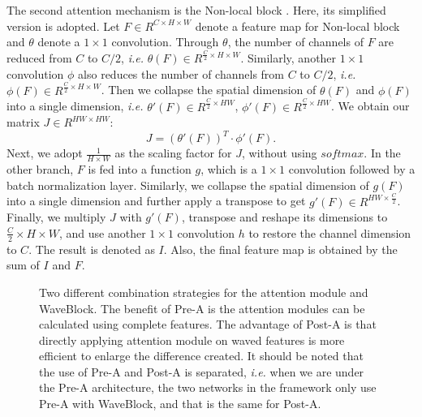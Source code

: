 \documentclass[journal]{IEEEtran}
\begin{document}
The second attention mechanism is the Non-local block \cite{wang2018non}. Here, its simplified version is adopted. Let $F \in {R^{ C \times H \times W}}$ denote a feature map for Non-local block and $\theta$ denote a $1 \times 1$ convolution. Through $\theta$, the number of channels of $F$ are reduced from $C$ to $C/2$, \textit{i.e.} $\theta \left( {{F}} \right) \in {R^{ \frac{C}{2} \times H \times W}}$. Similarly, another $1 \times 1$ convolution $\phi$ also reduces the number of channels from $C$ to $C/2$, \textit{i.e.} $\phi \left( {{F}} \right) \in {R^{ \frac{C}{2} \times H \times W}}$. Then we collapse the spatial dimension of $\theta \left( {{F}} \right)$ and $\phi \left( {{F}} \right)$ into a single dimension, \textit{i.e.} $\theta '\left( {{F}} \right) \in {R^{ \frac{C}{2} \times HW}}$, $\phi' \left( {{F}} \right) \in {R^{ \frac{C}{2} \times HW}}$. We obtain our matrix $J \in {R^{HW \times HW}}$:
\begin{equation}
J = {\left( {\theta '\left( F \right)} \right)^T} \cdot \phi '\left( F \right).
\end{equation}
Next, we adopt $\frac{1}{{H \times W}}$ as the scaling factor for $J$, without using $softmax$. In the other branch, $F$ is fed into a function $g$, which is a $1 \times 1$ convolution followed by a batch normalization layer. Similarly, we collapse the spatial dimension of $g({F})$ into a single dimension and further apply a transpose to get $g'({F}) \in {R^{ HW \times \frac{C}{2}}}$. Finally, we multiply $J$ with $g'({F})$, transpose and reshape its dimensions to $ \frac{C}{2} \times H \times W$, and use another $1 \times 1$ convolution $h$ to restore the channel dimension to $C$. The result is denoted as $I$. Also, the final feature map is obtained by the sum of $I$ and $F$.\par 
\begin{figure*}[t]
\centering    
 

 
\caption{Two different combination strategies for the attention module and WaveBlock. The benefit of Pre-A is the attention modules can be calculated using complete features. The advantage of Post-A is that directly applying attention module on waved features is more efficient to enlarge the difference created. It should be noted that the use of Pre-A and Post-A is separated, \textit{i.e.} when we are under the Pre-A architecture, the two networks in the framework only use Pre-A with WaveBlock, and that is the same for Post-A.}
 
\end{figure*}
\end{document}
